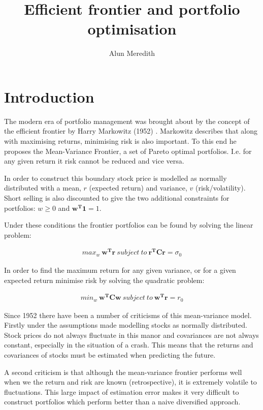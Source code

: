 \documentclass[a4paper,10pt, twocolumn]{article}
\begin{document}
\title{Efficient frontier and portfolio optimisation}
\author{Alun Meredith}
\maketitle

\section{Introduction}
The modern era of portfolio management was brought about by the concept of the efficient frontier by Harry Markowitz (1952) \cite{Portfolio}. Markowitz describes that along with maximising returns, minimising risk is also important. To this end he proposes the Mean-Variance Frontier, a set of Pareto optimal portfolios. I.e. for any given return it risk cannot be reduced and vice versa.   

In order to construct this boundary stock price is modelled as normally distributed with a mean, $r$ (expected return) and variance, $v$ (risk/volatility). Short selling is also discounted to give the two additional constraints for portfolios: $w \geq 0$ and $\mathbf{w^T1} = 1$.  

Under these conditions the frontier portfolios can be found by solving the linear problem:

\begin{align}
 max_w \  \mathbf{w^Tr} \  subject \  to \  \mathbf{r^TCr} = \sigma_0 
 \label{eq:return}
\end{align}

In order to find the maximum return for any given variance, or for a given expected return minimise risk by solving the quadratic problem:

\begin{align}
 min_w \ \mathbf{w^TCw} \ subject \  to \  \mathbf{w^Tr} = r_0
 \label{eq:var}
\end{align}

Since 1952 there have been a number of criticisms of this mean-variance model. Firstly under the assumptions made modelling stocks as normally distributed. Stock prices do not always fluctuate in this manor and covariances are not always constant, especially in the situation of a crash. This means that the returns and covariances of stocks must be estimated when predicting the future.  

A second criticism is that although the mean-variance frontier performs well when we the return and risk are known (retrospective), it is extremely volatile to fluctuations\cite{VsNaive}. This large impact of estimation error makes it very difficult to construct portfolios which perform better than a naive diversified approach. 
\end{document}
